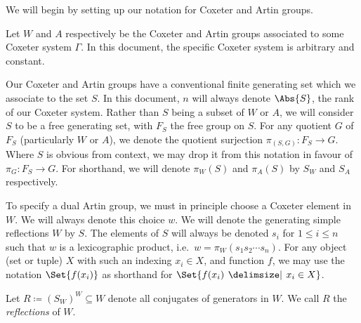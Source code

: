 We will begin by setting up our notation for Coxeter and Artin groups.

Let $W$ and  $A$ respectively be the Coxeter and Artin groups associated to some Coxeter system  $\Gamma$.
In this document, the specific Coxeter system is arbitrary and constant.

Our Coxeter and Artin groups have a conventional finite generating set which we associate to the set $S$.
In this document, $n$ will always denote $\Abs{S}$, the rank of our Coxeter system.
Rather than $S$ being a subset of  $W$ or  $A$, we will consider $S$ to be a free generating set, with $F_S$ the free group on $S$.
For any quotient $G$  of $F_S$ (particularly  $W$ or $A$), we denote the quotient surjection  $\pi_{(S,G)} \colon F_S \to G$.
Where $S$ is obvious from context, we may drop it from this notation in favour of  $\pi_G \colon F_S \to G$.
For shorthand, we will denote  $\pi_{W}(S)$ and  $\pi_{A}(S)$ by $S_W$ and  $S_A$ respectively.

To specify a dual Artin group, we must in principle choose a Coxeter element in $W$.
We will always denote this choice  $w$.
We will denote the generating simple reflections $W$ by $S$.
The elements of $S$ will always be denoted $s_i$ for  $1\leq i \leq n$ such that $w$ is a lexicographic product, i.e.~$w=\pi_{W}(s_1s_2\cdots s_n)$.
For any object (set or tuple) $X$ with such an indexing $x_i \in X$, and function $f$, we may use the notation $\Set{f(x_i)}$ as shorthand for $\Set{f(x_i) \given x_i \in X}$.

Let $R \coloneq (S_W)^{W} \subseteq W$ denote all conjugates of generators in $W$.
We call $R$ the \emph{reflections} of  $W$.


